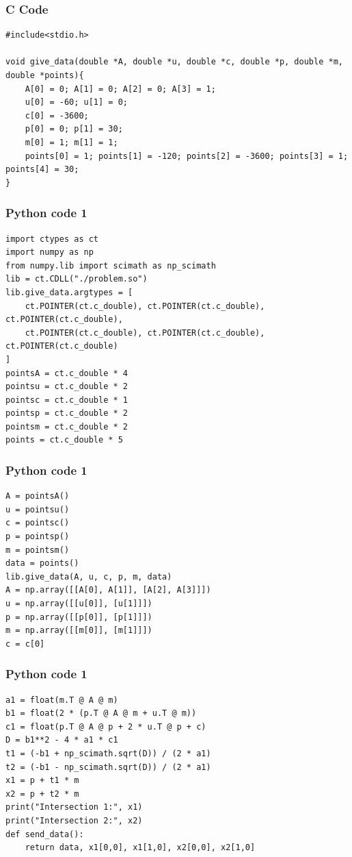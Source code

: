 \documentclass{beamer}
\begin{document}
\begin{frame}[fragile]
    \frametitle{C Code}
    \begin{lstlisting}
#include<stdio.h>

void give_data(double *A, double *u, double *c, double *p, double *m, double *points){
    A[0] = 0; A[1] = 0; A[2] = 0; A[3] = 1;
    u[0] = -60; u[1] = 0;
    c[0] = -3600;
    p[0] = 0; p[1] = 30;
    m[0] = 1; m[1] = 1; 
    points[0] = 1; points[1] = -120; points[2] = -3600; points[3] = 1; points[4] = 30;
}
    \end{lstlisting}
\end{frame}

\begin{frame}[fragile]
    \frametitle{Python code 1}
    \begin{lstlisting}
import ctypes as ct
import numpy as np
from numpy.lib import scimath as np_scimath
lib = ct.CDLL("./problem.so")
lib.give_data.argtypes = [
    ct.POINTER(ct.c_double), ct.POINTER(ct.c_double), ct.POINTER(ct.c_double),
    ct.POINTER(ct.c_double), ct.POINTER(ct.c_double), ct.POINTER(ct.c_double)
]
pointsA = ct.c_double * 4
pointsu = ct.c_double * 2
pointsc = ct.c_double * 1
pointsp = ct.c_double * 2
pointsm = ct.c_double * 2
points = ct.c_double * 5
    \end{lstlisting}
\end{frame}

\begin{frame}[fragile]
    \frametitle{Python code 1}
    \begin{lstlisting}
A = pointsA()
u = pointsu()
c = pointsc()
p = pointsp()
m = pointsm()
data = points()
lib.give_data(A, u, c, p, m, data)
A = np.array([[A[0], A[1]], [A[2], A[3]]])
u = np.array([[u[0]], [u[1]]])
p = np.array([[p[0]], [p[1]]])
m = np.array([[m[0]], [m[1]]])
c = c[0]
    \end{lstlisting}
\end{frame}

\begin{frame}[fragile]
    \frametitle{Python code 1}
    \begin{lstlisting}
a1 = float(m.T @ A @ m)
b1 = float(2 * (p.T @ A @ m + u.T @ m))
c1 = float(p.T @ A @ p + 2 * u.T @ p + c)
D = b1**2 - 4 * a1 * c1
t1 = (-b1 + np_scimath.sqrt(D)) / (2 * a1)
t2 = (-b1 - np_scimath.sqrt(D)) / (2 * a1)
x1 = p + t1 * m
x2 = p + t2 * m
print("Intersection 1:", x1)
print("Intersection 2:", x2)
def send_data():
    return data, x1[0,0], x1[1,0], x2[0,0], x2[1,0]
    \end{lstlisting}
\end{frame}
\end{document}
